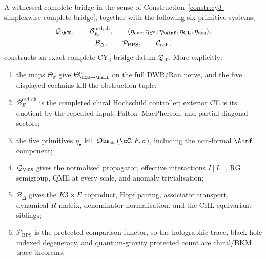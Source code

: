 \begin{theorem}
\label{thm:cy3-witnessed-package-realises-seven}
A witnessed complete bridge in the sense of
Construction~\ref{constr:cy3-simplexwise-complete-bridge}, together with
the following six primitive systems,
\[
\begin{gathered}
 \mathcal Q_{\hCS},\qquad
 \mathcal B^{\mathrm{ord,ch}}_{E_3},\qquad
 (\eta_{\mathrm{cyc}},\eta_{S^3},\eta_{\Ainf},
 \eta_{\mathrm{CL}},\eta_{\mathrm{des}}),\\
 \mathcal B_\Delta,\qquad
 \mathcal P_{\mathrm{BPS}},\qquad
 \mathcal C_{\mathrm{coh}},
\end{gathered}
\]
constructs an exact complete CY$_3$ bridge datum
$\mathfrak D_X$. More explicitly:
\begin{enumerate}
\item the maps $\Theta_\sigma$ give
$\Theta_{\hCS\to\Hall}^{\mathrm{or}}$ on the full DWR/Ran nerve, and the
five displayed cochains kill the obstruction tuple;
\item $\mathcal B^{\mathrm{ord,ch}}_{E_3}$ is the completed chiral
Hochschild controller; exterior CE is its quotient by the
repeated-input, Fulton--MacPherson, and partial-diagonal sectors;
\item the five primitives $\eta_\bullet$ kill
$\mathfrak{Obs}_{\mathrm{str}}(\cC,F,\sigma)$, including the
non-formal $\Ainf$ component;
\item $\mathcal Q_{\hCS}$ gives the normalised propagator, effective
interactions $I[L]$, RG semigroup, QME at every scale, and anomaly
trivialisation;
\item $\mathcal B_\Delta$ gives the $K3\times E$ coproduct, Hopf pairing,
associator transport, dynamical $R$-matrix, denominator normalisation,
and the CHL equivariant siblings;
\item $\mathcal P_{\mathrm{BPS}}$ is the protected comparison functor,
so the holographic trace, black-hole indexed degeneracy, and
quantum-gravity protected count are chiral/BKM trace theorems.
\end{enumerate}
\end{theorem}

